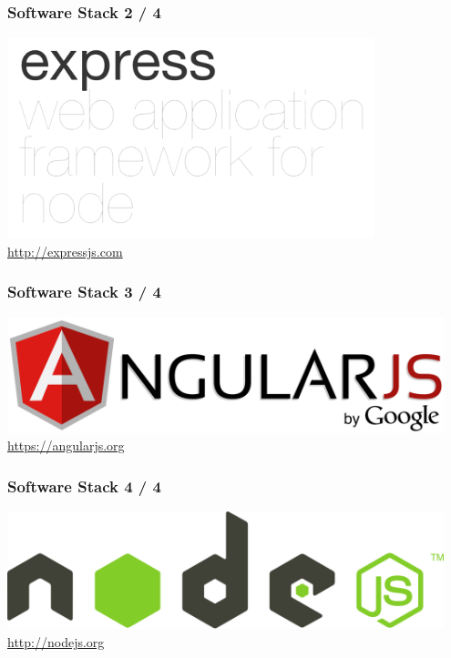 \documentclass[10pt, compress]{beamer}
\begin{document}
\begin{frame}[fragile]

  \frametitle{Software Stack 2 / 4}

  \begin{center}
    \includegraphics[width=0.8\textwidth]{images/express}
    \vspace{1cm}
    \url{http://expressjs.com}
  \end{center}

\end{frame}

\begin{frame}[fragile]

  \frametitle{Software Stack 3 / 4}

  \begin{center}
    \includegraphics[width=0.95\textwidth]{images/angularjs}
    \vspace{1cm}
    \url{https://angularjs.org}
  \end{center}

\end{frame}

\begin{frame}[fragile]

  \frametitle{Software Stack 4 / 4}

  \begin{center}
    \includegraphics[width=0.95\textwidth]{images/nodejs}
    \vspace{1cm}
    \url{http://nodejs.org}
  \end{center}

\end{frame}
\end{document}
